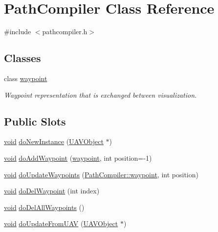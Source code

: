 \hypertarget{class_path_compiler}{\section{\-Path\-Compiler \-Class \-Reference}
\label{class_path_compiler}
}


{\ttfamily \#include $<$pathcompiler.\-h$>$}

\subsection*{\-Classes}
\begin{DoxyCompactItemize}
\item 
class \hyperlink{class_path_compiler_1_1waypoint}{waypoint}
\begin{DoxyCompactList}\small\item\em \-Waypoint representation that is exchanged between visualization. \end{DoxyCompactList}\end{DoxyCompactItemize}
\subsection*{\-Public \-Slots}
\begin{DoxyCompactItemize}
\item 
\hyperlink{group___u_a_v_objects_plugin_ga444cf2ff3f0ecbe028adce838d373f5c}{void} \hyperlink{group___o_p_map_plugin_ga1089b3cd3bacf871b8db6f14a1305819}{do\-New\-Instance} (\hyperlink{class_u_a_v_object}{\-U\-A\-V\-Object} $\ast$)
\item 
\hyperlink{group___u_a_v_objects_plugin_ga444cf2ff3f0ecbe028adce838d373f5c}{void} \hyperlink{group___o_p_map_plugin_gac62083613851ca96a2d14632d9553171}{do\-Add\-Waypoint} (\hyperlink{class_path_compiler_1_1waypoint}{waypoint}, int position=-\/1)
\item 
\hyperlink{group___u_a_v_objects_plugin_ga444cf2ff3f0ecbe028adce838d373f5c}{void} \hyperlink{group___o_p_map_plugin_gaadeb33c165349ef42df9dffe0d9d7b57}{do\-Update\-Waypoints} (\hyperlink{class_path_compiler_1_1waypoint}{\-Path\-Compiler\-::waypoint}, int position)
\item 
\hyperlink{group___u_a_v_objects_plugin_ga444cf2ff3f0ecbe028adce838d373f5c}{void} \hyperlink{group___o_p_map_plugin_ga2e7d1eed3bd9981e4f1c7d4bfeeeeba4}{do\-Del\-Waypoint} (int index)
\item 
\hyperlink{group___u_a_v_objects_plugin_ga444cf2ff3f0ecbe028adce838d373f5c}{void} \hyperlink{group___o_p_map_plugin_ga43eeb28430ee8c4569a8163c34198403}{do\-Del\-All\-Waypoints} ()
\item 
\hyperlink{group___u_a_v_objects_plugin_ga444cf2ff3f0ecbe028adce838d373f5c}{void} \hyperlink{group___o_p_map_plugin_ga559ab15dae5623715205528a06b9addc}{do\-Update\-From\-U\-A\-V} (\hyperlink{class_u_a_v_object}{\-U\-A\-V\-Object} $\ast$)
\end{DoxyCompactItemize}
